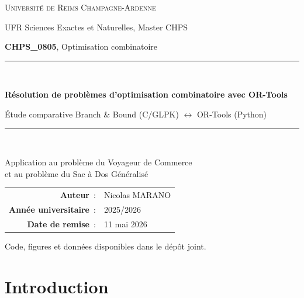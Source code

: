 \documentclass[11pt,a4paper]{article}
\begin{document}

\begin{titlepage}
\centering
\vspace*{2.5cm}

{\Large\textsc{Université de Reims Champagne-Ardenne} \par}
{\large UFR Sciences Exactes et Naturelles, Master CHPS \par}
\vspace{0.5cm}
{\large \textbf{CHPS\_0805}, Optimisation combinatoire \par}

\vspace{2.5cm}
\rule{\linewidth}{0.4pt}\\[0.5cm]
{\Huge\bfseries Résolution de problèmes d'optimisation combinatoire avec OR-Tools \par}
\vspace{0.4cm}
{\Large Étude comparative Branch \& Bound (C/GLPK) $\leftrightarrow$ OR-Tools (Python) \par}
\rule{\linewidth}{0.4pt}\\[1cm]

{\large Application au problème du Voyageur de Commerce \\ et au problème du Sac à Dos Généralisé \par}

\vfill

\begin{tabular}{rl}
\textbf{Auteur}~: & Nicolas MARANO \\
\textbf{Année universitaire}~: & 2025/2026 \\
\textbf{Date de remise}~: & 11 mai 2026 \\
\end{tabular}

\vspace{1cm}
{\small Code, figures et données disponibles dans le dépôt joint.\par}
\end{titlepage}

\tableofcontents
\thispagestyle{fancy}
\newpage

\section{Introduction}
\end{document}
